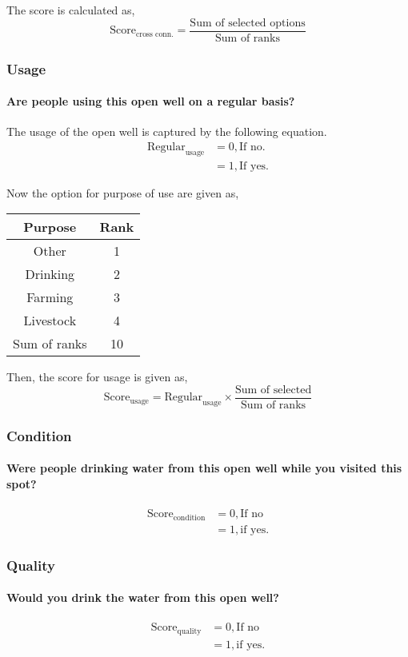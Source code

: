 \documentclass[oneside,twocolumn]{article}
\newcommand{\tsub}[2]{\text{#1}_{\text{#2}}}
\newcommand{\dsub}[2]{\dfrac{\text{#1}}{\text{#2}}}
\newenvironment{ttable}
{
\begin{center}
\begin{tabular}{c|c}
\hline
}
{
\\ \hline
\end{tabular}
\end{center}
}
\begin{document}
The score is calculated as,
\[
	\tsub{Score}{cross conn.} = \dsub{Sum of selected options}{Sum of ranks}
\]

\subsubsection{Usage}
\paragraph{Are people using this open well on a regular basis?}
The usage of the open well is captured by the following equation.
\begin{align*}
	\tsub{Regular}{usage} &= 0, \text{If no.} \\
	&= 1, \text{If yes.}
\end{align*}

Now the option for purpose of use are given as,
\begin{ttable}
	Purpose & Rank \\ \hline
	Other & 1 \\
	Drinking & 2 \\
	Farming & 3 \\
	Livestock & 4 \\ \hline
	Sum of ranks & 10
\end{ttable}
Then, the score for usage is given as,
\[
	\tsub{Score}{usage} = \tsub{Regular}{usage} \times \dsub{Sum of selected}{Sum of ranks}
\]

\subsubsection{Condition}
\paragraph{Were people drinking water from this open well while you visited this spot?}
\begin{align*}
	\tsub{Score}{condition} &= 0, \text{If no} \\
	&= 1, \text{if yes}.
\end{align*}

\subsubsection{Quality}
\paragraph{Would you drink the water from this open well?}
\begin{align*}
	\tsub{Score}{quality} &= 0, \text{If no} \\
	&= 1, \text{if yes}.
\end{align*}
\end{document}

